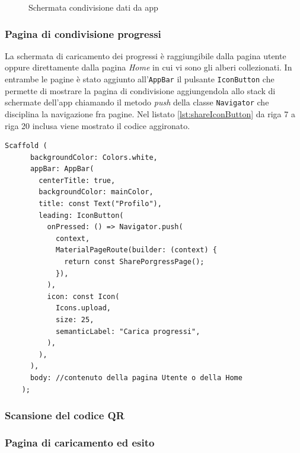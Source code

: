 \begin{figure}[h!]
{        \label{fig:uploadinData}
    }
    \caption{Schermata condivisione dati da app}
    \label{fig:shareDataApp}
\end{figure}

\subsubsection{Pagina di condivisione progressi}
La schermata di caricamento dei progressi è raggiungibile dalla pagina utente oppure direttamente dalla pagina \textit{Home} in cui vi sono gli alberi collezionati. In entrambe le pagine è stato aggiunto all'\texttt{AppBar} il pulsante \texttt{IconButton} che permette di mostrare la pagina di condivisione aggiungendola allo stack di schermate dell'app chiamando il metodo \textit{push} della classe \texttt{Navigator} che disciplina la navigazione fra pagine. Nel listato \ref{lst:shareIconButton} da riga 7 a riga 20 inclusa viene mostrato il codice aggironato.

\begin{lstlisting}[style=FlutterStyle, caption={Codice aggiornato della barra degli strumenti dell'app: inserito pulsante per la condivisione dei progressi.}, label={lst:shareIconButton}]
    Scaffold (
      backgroundColor: Colors.white,
      appBar: AppBar(
        centerTitle: true,
        backgroundColor: mainColor, 
        title: const Text("Profilo"),
        leading: IconButton(
          onPressed: () => Navigator.push(
            context,
            MaterialPageRoute(builder: (context) {
              return const SharePorgressPage();
            }),
          ),
          icon: const Icon(
            Icons.upload,
            size: 25,
            semanticLabel: "Carica progressi",
          ),
        ),
      ),
      body: //contenuto della pagina Utente o della Home
    );
\end{lstlisting}

\subsubsection{Scansione del codice QR}
\subsubsection{Pagina di caricamento ed esito}

